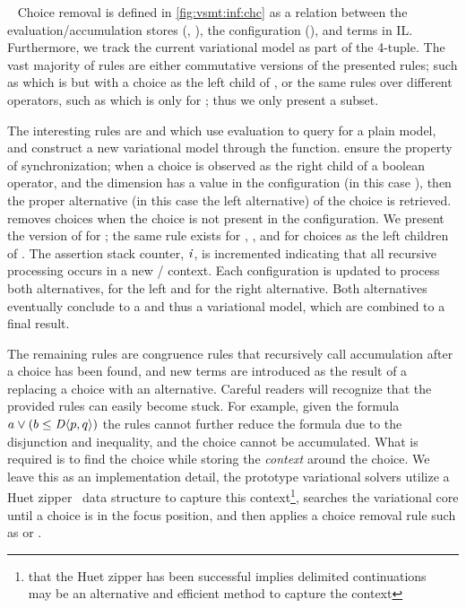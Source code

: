 ~\label{section:vsmt:choice-removal}
%
Choice removal is defined in \autoref{fig:vsmt:inf:chc} as a relation between
the evaluation/accumulation stores (\aStore{}, \eStore{}), the configuration
(\configuration{}), and terms in IL\@. Furthermore, we track the current
variational model as part of the 4-tuple. The vast majority of rules are either
commutative versions of the presented rules; such as  which is
 but with a choice as the left child of \boolFuncs{}, or the same
rules over different operators, such as  which is 
only for \inequalities{}; thus we only present a subset.

The interesting rules are  and  which use evaluation to
query for a plain model, and construct a new variational model through the
 function.  ensure the property of
synchronization; when a choice is observed as the right child of a boolean
operator, and the dimension has a value in the configuration (in this case
\true{}), then the proper alternative (in this case the left alternative) of the
choice is retrieved.  removes choices when the choice is not
present in the configuration. We present the version of  for
\inequalities{}; the same rule exists for \boolFuncs{}, \integerFuncs{}, and for
choices as the left children of \inequalities{}. The assertion stack counter,
$\mathit{i}$, is incremented indicating that all recursive processing occurs in a
new / context. Each configuration is updated to process
both alternatives, \true{} for the left and \false{} for the right alternative.
Both alternatives eventually conclude to a \unit{} and thus a variational model,
which are combined to a final result.

The remaining rules are congruence rules that recursively call accumulation
after a choice has been found, and new terms are introduced as the result of a
replacing a choice with an alternative. Careful readers will recognize that the
provided rules can easily become stuck. For example, given the formula $a \vee{}
(b \leq{} \chc[D]{p,q})$ the rules cannot further reduce the formula due to the
disjunction and inequality, and the choice cannot be accumulated. What is
required is to find the choice while storing the \emph{context} around the
choice. We leave this as an implementation detail, the prototype variational
solvers utilize a Huet zipper~\cite{huet_1997} data structure to capture this
context\footnote{that the Huet zipper has been successful implies delimited
  continuations~ may be an alternative and efficient method to
  capture the context}, searches the variational core until a choice is in the
focus position, and then applies a choice removal rule such as
 or .
